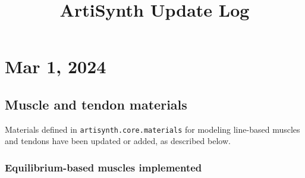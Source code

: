 \documentclass{article}
\title{ArtiSynth Update Log}
\date{}
\begin{document}
\iflatexml
\else
\maketitle
\fi

%
%
%





\section*{Mar 1, 2024}

\subsection*{Muscle and tendon materials}

Materials defined in {\tt artisynth.core.materials} for modeling
line-based muscles and tendons have been updated or added, as
described below.

\subsubsection{Equilibrium-based muscles implemented}
\end{document}
